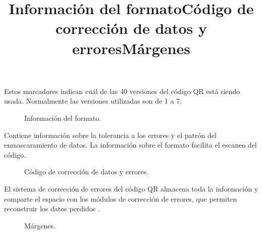 Estos marcadores indican cuál de las 40 versiones del código QR está siendo usada. Normalmente las versiones utilizadas son de 1 a 7. \cite{CitaA01}\\

\title{Información del formato}

\begin{figure}[htbp]
	\begin{center}
		\caption{Información del formato.}
		\label{fig:formato2}
	\end{center}
\end{figure}

Contiene información sobre la tolerancia a los errores y el patrón del enmascaramiento de datos. La información sobre el formato facilita el escaneo del código. \cite{CitaA01}\\

\newpage
\title{Código de corrección de datos y errores}

\begin{figure}[htbp]
	\begin{center}
		\caption{Código de corrección de datos y errores.}
		\label{fig:erroresDatos}
	\end{center}
\end{figure}

El sistema de corrección de errores del código QR almacena toda la información y comparte el espacio con los módulos de corrección de errores, que permiten reconstruir los datos perdidos\cite{CitaA01} . \\

\title{Márgenes}

\begin{figure}[htbp]
	\begin{center}
		\caption{Márgenes.}
		\label{fig:margenes}
	\end{center}
\end{figure}

